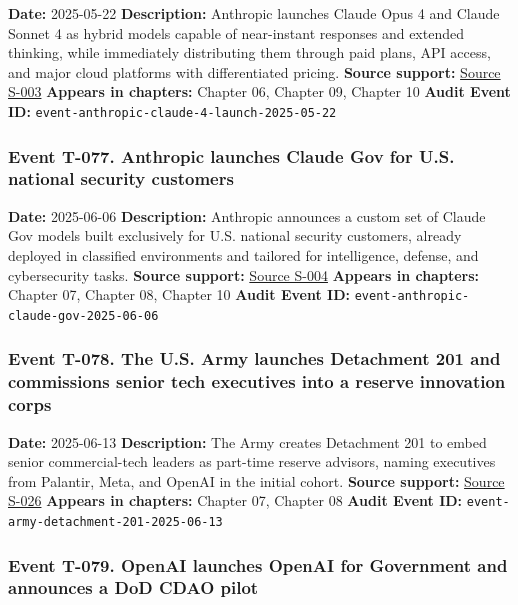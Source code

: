 \documentclass[
  american,
  11pt,
  letterpaper,
]{article}
\begin{document}
\textbf{Date:} 2025-05-22 \textbf{Description:} Anthropic launches
Claude Opus 4 and Claude Sonnet 4 as hybrid models capable of
near-instant responses and extended thinking, while immediately
distributing them through paid plans, API access, and major cloud
platforms with differentiated pricing. \textbf{Source support:}
\hyperref[source-s-003-introducing-claude-4]{Source S-003}
\textbf{Appears in chapters:} Chapter 06, Chapter 09, Chapter 10
\textbf{Audit Event ID:}
\texttt{event-anthropic-claude-4-launch-2025-05-22}

\subsubsection{Event T-077. Anthropic launches Claude Gov for U.S.
national security
customers}\label{event-t-077-anthropic-launches-claude-gov-for-u-s-national-security-customers}

\textbf{Date:} 2025-06-06 \textbf{Description:} Anthropic announces a
custom set of Claude Gov models built exclusively for U.S. national
security customers, already deployed in classified environments and
tailored for intelligence, defense, and cybersecurity tasks.
\textbf{Source support:}
\hyperref[source-s-004-claude-gov-models-for-u-s-national-security-customers]{Source
S-004} \textbf{Appears in chapters:} Chapter 07, Chapter 08, Chapter 10
\textbf{Audit Event ID:} \texttt{event-anthropic-claude-gov-2025-06-06}

\subsubsection{Event T-078. The U.S. Army launches Detachment 201 and
commissions senior tech executives into a reserve innovation
corps}\label{event-t-078-the-u-s-army-launches-detachment-201-and-commissions-senior-tech-executives-into-a-reserve-innovation-corps}

\textbf{Date:} 2025-06-13 \textbf{Description:} The Army creates
Detachment 201 to embed senior commercial-tech leaders as part-time
reserve advisors, naming executives from Palantir, Meta, and OpenAI in
the initial cohort. \textbf{Source support:}
\hyperref[source-s-026-army-launches-detachment-201-executive-innovation-corps-to-drive-tech-transformation]{Source
S-026} \textbf{Appears in chapters:} Chapter 07, Chapter 08
\textbf{Audit Event ID:} \texttt{event-army-detachment-201-2025-06-13}

\subsubsection{Event T-079. OpenAI launches OpenAI for Government and
announces a DoD CDAO
pilot}\label{event-t-079-openai-launches-openai-for-government-and-announces-a-dod-cdao-pilot}
\end{document}
